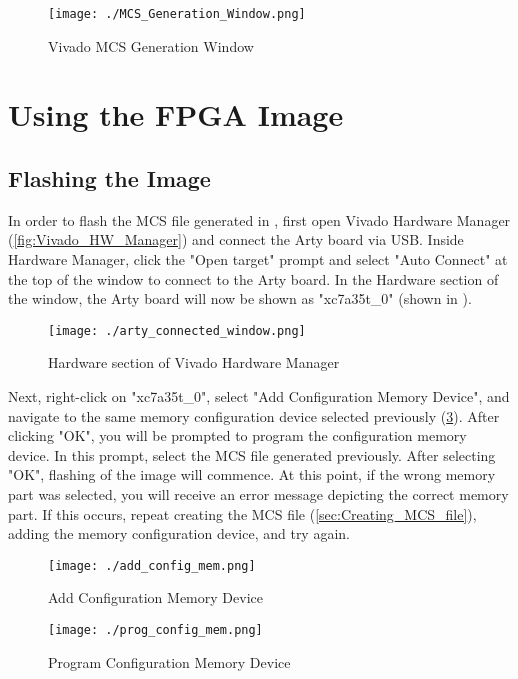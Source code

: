 	\begin{figure}[h!tbp]
		\centering
		\texttt{[image: ./MCS\_Generation\_Window.png]}
		\caption{Vivado MCS Generation Window}
		\label{fig:Vivado_MCS_Window}
	\end{figure}
	

\section{Using the FPGA Image}\label{sec:Using_FPGA_Image}
\subsection{Flashing the Image}\label{sec:Flash_FPGA_Image}
	In order to flash the MCS file generated in , first open Vivado Hardware Manager (\ref{fig:Vivado_HW_Manager}) and connect the Arty board via USB. Inside Hardware Manager, click the "Open target" prompt and select "Auto Connect" at the top of the window to connect to the Arty board. In the Hardware section of the window, the Arty board will now be shown as "xc7a35t\_0" (shown in ). 
	
	\begin{figure}[h!tbp]
		\centering
		\texttt{[image: ./arty\_connected\_window.png]}
		\caption{Hardware section of Vivado Hardware Manager}
		\label{fig:Vivado_HW_connected}
	\end{figure}
	
	Next, right-click on "xc7a35t\_0", select "Add Configuration Memory Device", and navigate to the same memory configuration device selected previously (\ref{fig:add_config_mem}). After clicking "OK", you will be prompted to program the configuration memory device. In this prompt, select the MCS file generated previously. After selecting "OK", flashing of the image will commence. At this point, if the wrong memory part was selected, you will receive an error message depicting the correct memory part. If this occurs, repeat creating the MCS file (\ref{sec:Creating_MCS_file}), adding the memory configuration device, and try again.
	
	\begin{figure}[h!tbp]
		\centering
		\texttt{[image: ./add\_config\_mem.png]}
		\caption{Add Configuration Memory Device}
		\label{fig:add_config_mem}
	\end{figure}
	
	\begin{figure}[h!tbp]
		\centering
		\texttt{[image: ./prog\_config\_mem.png]}
		\caption{Program Configuration Memory Device}
		\label{fig:prog_config_mem}
	\end{figure}
	
